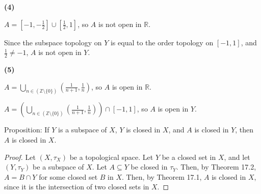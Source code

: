 \documentclass{article}
\newcommand{\Z}{\mathbb Z}
\newcommand{\R}{\mathbb R}
\begin{document}
\medskip
{\bf (4)}

    $A = \left[-1, -\frac12\right] \cup \left[\frac12, 1\right]$, so $A$ is not open in $\R$.

    Since the subspace topology on $Y$ is equal to the order topology on $[-1,1]$, and $\frac12 \neq -1$, $A$ is not open in $Y$.

\medskip
{\bf (5)}

    $A = \bigcup\limits_{n \in (\Z \setminus \{0\})} \left(\frac{1}{n+1}, \frac{1}{n}\right)$, so $A$ is open in $\R$.

    $A = \left(\bigcup\limits_{n \in (\Z \setminus \{0\})} \left(\frac{1}{n+1}, \frac{1}{n}\right)\right) \cap [-1,1]$, so $A$ is open in $Y$.

\newpage
{} Proposition: If $Y$ is a subspace of $X$, $Y$ is closed in $X$, and $A$ is closed in $Y$, then $A$ is closed in $X$.
\begin{proof}
    Let $(X, \tau_X)$ be a topological space.
    Let $Y$ be a closed set in $X$, and let $(Y, \tau_Y)$ be a subspace of $X$.
    Let $A \subseteq Y$ be closed in $\tau_Y$.
    Then, by Theorem 17.2, $A = B \cap Y$ for some closed set $B$ in $X$.
    Then, by Theorem 17.1, $A$ is closed in $X$, since it is the intersection of two closed sets in $X$.
\end{proof}
\end{document}
